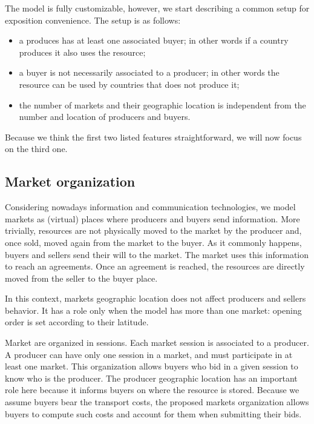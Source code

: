 \documentclass{article}
\begin{document}
The model is fully customizable, however, we start describing a common setup for exposition convenience. The setup is as follows:
\begin{itemize}
	\item a produces has at least one associated buyer; in other words if a country produces it also uses the resource; 
	\item a buyer is not necessarily associated to a producer; in other words the resource can be used by countries that does not produce it;
	\item the number of markets and their geographic location is independent from the number and location of producers and buyers.
\end{itemize}
Because we think the first two listed features straightforward, we will now focus on the third one.
\subsection{Market organization}
Considering nowadays information and communication technologies, we model markets as (virtual) places where producers and buyers send information. More trivially, resources are not physically moved to the market by the producer and, once sold, moved again from the market to the buyer. As it commonly happens, buyers and sellers send their will to the market. The market uses this information to reach an agreements. Once an agreement is reached, the resources are directly moved from the seller to the buyer place.

In this context, markets geographic location does not affect producers and sellers behavior. It has a role only when the model has more than one market: opening order is set according to their latitude.

Market are organized in sessions. Each market session is associated to a producer. A producer can have only one session in a market, and must participate in at least one market. This organization allows buyers who bid in a given session to know who is the producer. The producer geographic location has an important role here because it informs buyers on where the resource is stored. Because we assume buyers bear the transport costs, the proposed markets organization allows buyers to compute such costs and account for them when submitting their bids.
\end{document}
